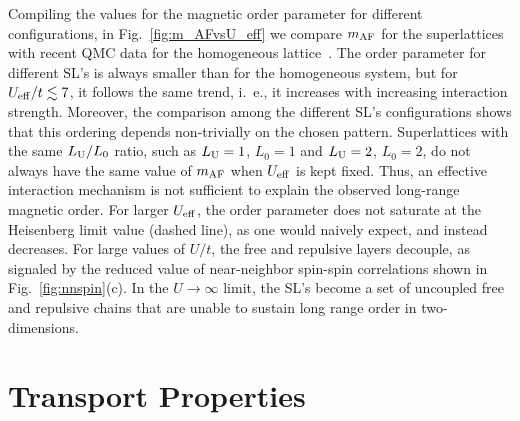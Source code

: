 \documentclass[aps,pra,reprint,twocolumn,showpacs,longbibliography,superscriptaddress]{revtex4-1}
\begin{document}
Compiling the values for the magnetic order parameter for different configurations, in Fig.~\ref{fig:m_AFvsU_eff} we compare $m_{\rm AF}$ for the superlattices with
 recent QMC data for the homogeneous lattice~\cite{Varney09}. The order parameter for different SL's is always smaller than for the homogeneous system, but  for  $U_{\rm eff}/t \lesssim 7$, it follows the same trend, i.~e., it increases with increasing interaction strength.  Moreover, the comparison among the different SL's configurations shows that this ordering depends non-trivially on the chosen pattern. Superlattices with the same $L_{\rm U}/L_0$ ratio, such as $L_{\rm U}=1$,  $L_0=1$ and $L_{\rm U}=2$,  $L_0=2$, do not always have the same value of $m_{\rm AF}$ when $U_{\rm eff}$ is kept fixed. Thus, an effective interaction mechanism is not sufficient to explain the observed long-range magnetic order. 
 For larger $U_{\rm eff}$, the order parameter does not saturate at the Heisenberg limit value (dashed line), as one would naively expect, and instead decreases. For large values of $U/t$, the free and repulsive layers decouple, as signaled by the reduced value of near-neighbor spin-spin correlations shown in Fig.~\ref{fig:nnspin}(c). In the $U \to \infty$ limit, the SL's become a set of uncoupled free and repulsive chains that are unable to sustain long range order in two-dimensions.

\section{Transport Properties}
\label{sec:transport}
\end{document}
